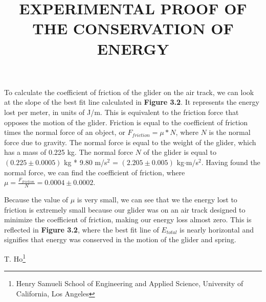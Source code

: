 \documentclass[11pt]{report}
\begin{document}
\setlength{\parindent}{5ex}
To calculate the coefficient of friction of the glider on the air track, we can
look at the slope of the best fit line calculated in \textbf{Figure 3.2}. It represents the
energy lost per meter, in units of J/m.  This is equivalent to the friction
force that opposes the motion of the glider. Friction is equal to the
coefficient of friction times the normal force of an object, or \(F_{friction} = \mu
* N\), where \(N\) is the normal force due to gravity.  The normal force is
equal to the weight of the glider, which has a mass of 0.225 kg.  The normal
force \(N\) of the glider is equal to \((0.225 \pm 0.0005)\) kg * 9.80 m/s$^2$ = \((2.205
\pm 0.005)\) kg$\cdot$m/s$^2$.  Having found the normal force, we can find the coefficient
of friction, where \(\mu = \frac{F_{friction}}{N} = 0.0004 \pm 0.0002\).


Because the value of $\mu$ is very small, we can see that we the energy lost 
to friction is extremely small because our glider was on an air track designed 
to minimize the coefficient of friction, making our energy loss almost zero.
This is reflected in \textbf{Figure 3.2}, where the best fit line of
\(E_{total}\) is nearly horizontal and signifies that energy was conserved in
the motion of the glider and spring.

\clearpage
{}

\begin{center}
\title{
    \Large \textbf{\uppercase{Experimental Proof of the Conservation of Energy}}
}

T. Ho\footnote{Henry Samueli School of Engineering and Applied Science,
University of California, Los Angeles}
\end{center}
\end{document}
